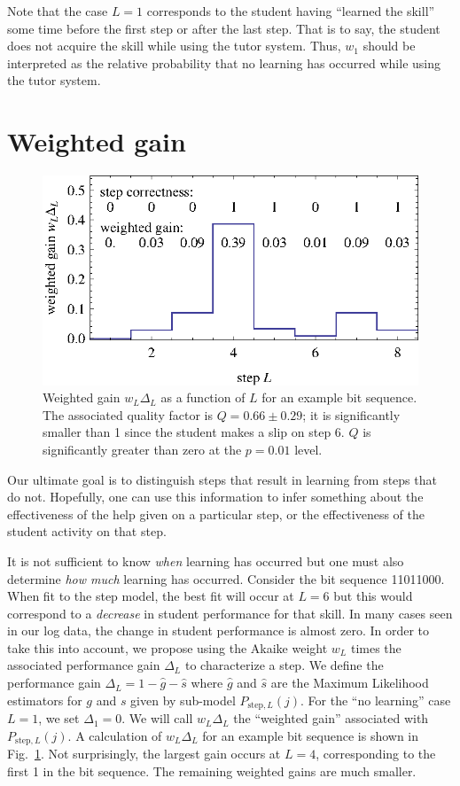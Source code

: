\documentclass{edm_template}
\begin{document}
Note that the case $L=1$ corresponds to the student having 
``learned the skill'' some time before the first step or after the
last step.  That is to say, 
the student does not acquire the skill while using the tutor system.
Thus, $w_1$ should be interpreted as the relative probability
that no learning has occurred while using the tutor system.

\section{Weighted gain}

\begin{figure}
  \centering \includegraphics{weighted-gains.eps}
   \caption{Weighted gain $w_L\Delta_L$ as a function of $L$ for an example bit sequence.
    The associated quality factor is $Q=0.66\pm0.29$;  it is
     significantly smaller than 1 since the student makes
     a slip on step 6.  $Q$ is significantly greater than zero at the $p=0.01$ level.}
    \label{weighted-gain-example}
\end{figure}

Our ultimate goal is to distinguish steps that result in 
learning from steps that do not.  Hopefully, one can use this
information to infer something about the effectiveness of the help
given on a particular step, or the effectiveness of
the student activity on that step.

It is not sufficient to know {\it when} learning has occurred but one
must also determine {\it how much} learning has occurred.  Consider
the bit sequence 11011000.  When fit to the step model, the best fit
will occur at $L=6$ but this would correspond to a {\it decrease} in student
performance for that skill.  In many cases seen in our log data, 
the change in student performance is almost zero.  In order to take 
this into account,
we propose using the Akaike weight $w_L$ times the associated performance
gain $\Delta_L$ to characterize a step.  We define the performance gain
$\Delta_L=1-\hat{g}-\hat{s}$ where $\hat{g}$ and $\hat{s}$ are the
Maximum Likelihood estimators for $g$ and $s$ given by sub-model
$P_{\mathrm{step},L}(j)$.  For the ``no learning'' case $L=1$, we set
$\Delta_1=0$.  We will call $w_L \Delta_L$ the ``weighted gain''
associated with $P_{\mathrm{step},L}(j)$.
A calculation of $w_L \Delta_L$  for an example bit sequence is
shown in Fig.~\ref{weighted-gain-example}.  Not surprisingly, 
the largest gain occurs at $L=4$, corresponding to the first 1 in the
bit sequence.  The remaining weighted gains are much smaller.
\end{document}
